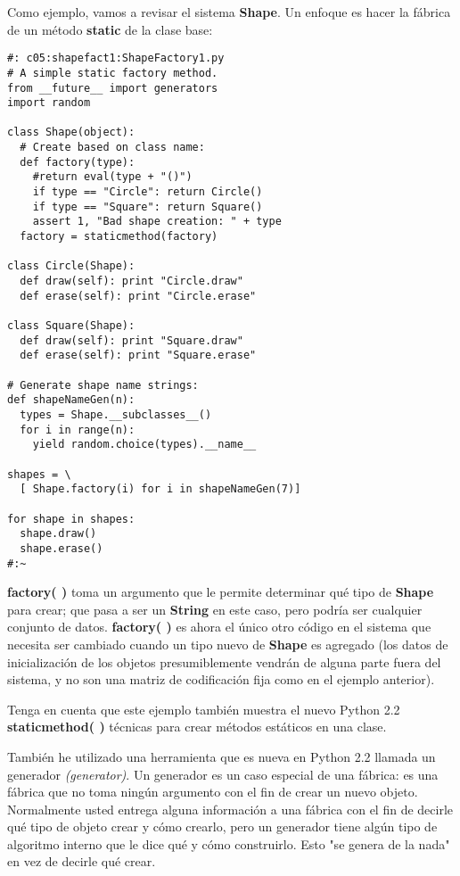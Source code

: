 Como ejemplo, vamos a revisar el sistema \textbf{Shape}. 
Un enfoque es hacer la fábrica de un método \textbf{static} de la clase base:   \newline

\begin{lstlisting} 
#: c05:shapefact1:ShapeFactory1.py 
# A simple static factory method. 
from __future__ import generators 
import random 

class Shape(object): 
  # Create based on class name: 
  def factory(type): 
    #return eval(type + "()") 
    if type == "Circle": return Circle() 
    if type == "Square": return Square() 
    assert 1, "Bad shape creation: " + type 
  factory = staticmethod(factory) 
  
class Circle(Shape): 
  def draw(self): print "Circle.draw"  
  def erase(self): print "Circle.erase"  
  
class Square(Shape): 
  def draw(self): print "Square.draw"  
  def erase(self): print "Square.erase"  
  
# Generate shape name strings: 
def shapeNameGen(n): 
  types = Shape.__subclasses__() 
  for i in range(n): 
    yield random.choice(types).__name__ 
    
shapes = \ 
  [ Shape.factory(i) for i in shapeNameGen(7)] 
  
for shape in shapes: 
  shape.draw() 
  shape.erase() 
#:~   
\end{lstlisting}

\textbf{factory( )} toma un argumento que le permite determinar qué tipo de \textbf{Shape} para crear; que pasa a ser un \textbf{String} en este caso, pero podría ser cualquier conjunto de datos.  \textbf{factory( )} es ahora el único otro código en el sistema que necesita ser cambiado cuando un tipo nuevo de \textbf{Shape} es agregado (los datos de inicialización de los objetos presumiblemente vendrán de alguna parte fuera del sistema, y no son una matriz de codificación fija como en el ejemplo anterior).    \newline

Tenga en cuenta que este ejemplo también muestra el nuevo Python 2.2 \textbf{staticmethod( )} técnicas para crear métodos estáticos en una clase.     \newline

También he utilizado una herramienta que es nueva en Python 2.2 llamada un generador \textit{(generator)}. Un generador es un caso especial de una fábrica: es una fábrica que no toma ningún argumento con el fin de crear un nuevo objeto. Normalmente usted entrega alguna información a una fábrica con el fin de decirle qué tipo de objeto crear y cómo crearlo, pero un generador tiene algún tipo de algoritmo interno que le dice qué y cómo construirlo. Esto "se genera de la nada" en vez de decirle qué crear. \newline

